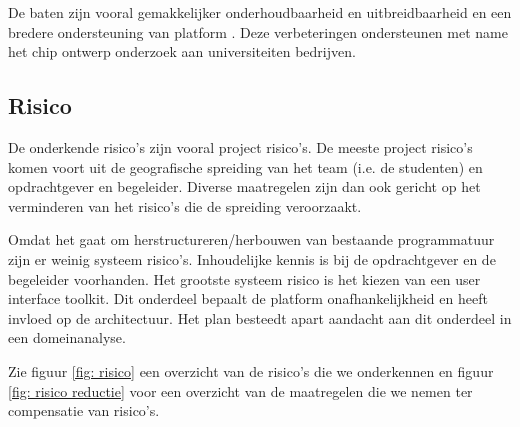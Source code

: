 De baten zijn vooral gemakkelijker onderhoudbaarheid en uitbreidbaarheid en een bredere ondersteuning van platform .
Deze verbeteringen ondersteunen met name het chip ontwerp onderzoek aan universiteiten bedrijven.

\subsection{Risico}

De onderkende risico's zijn vooral project risico's. De meeste project risico's komen voort uit de
geografische spreiding van het team (i.e. de studenten) en opdrachtgever
en begeleider. Diverse maatregelen zijn dan ook gericht op het verminderen
van het risico's die de spreiding veroorzaakt.


Omdat het gaat om herstructureren/herbouwen van bestaande programmatuur zijn er weinig systeem risico's.
Inhoudelijke kennis is bij de opdrachtgever en de begeleider voorhanden. Het grootste systeem risico is het kiezen
van een user interface toolkit. Dit onderdeel bepaalt de platform onafhankelijkheid en heeft invloed op de architectuur.
Het plan besteedt apart aandacht aan dit onderdeel in een domeinanalyse.

Zie figuur \ref{fig: risico} een overzicht van de risico's die we onderkennen en figuur \ref{fig: risico reductie} voor
een overzicht van de maatregelen die we nemen ter compensatie van risico's.


